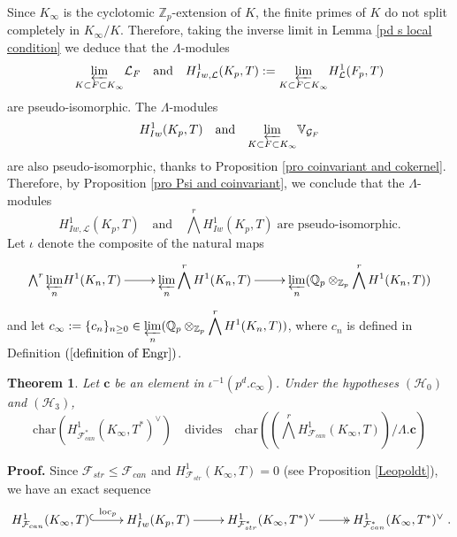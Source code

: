 \documentclass[reqno]{amsart}
\newcounter{dummy} \numberwithin{dummy}{section}
\newtheorem{theo}[dummy]{Theorem }
\begin{document}
Since $K_{\infty}$ is the cyclotomic $\mathbb{Z}_{p}$-extension of
$K$, the  finite primes of $K$ do not split completely in
$K_{\infty}/K$. Therefore, taking the inverse limit in Lemma \ref{pd
s local condition} we deduce that  the $\Lambda$-modules
\begin{equation*}
\displaystyle{\varprojlim_{K\subset F\subset
    K_{\infty}}}\mathcal{L}_{F}\quad\mbox{and}\quad H^{1}_{Iw,\mathcal{L}}(K_{p},T):=\displaystyle{\varprojlim_{K\subset F\subset
    K_{\infty}}}H^{1}_{\mathcal{L}}(F_{p},T)
\end{equation*}
 are pseudo-isomorphic.
  The $\Lambda$-modules
\begin{equation*}
H^{1}_{Iw}(K_{p},T)\quad\mbox{and}\quad
\displaystyle{\varprojlim_{K\subset F\subset
K_{\infty}}}\mathbb{V}_{\mathcal{G}_{F}}
\end{equation*} are also pseudo-isomorphic, thanks to Proposition \ref{pro  coinvariant
and cokernel}. Therefore, by Proposition \ref{pro Psi and
coinvariant}, we conclude that the $\Lambda$-modules
\begin{equation}\label{remark pseudo isomorphic}
H^{1}_{Iw,\mathcal{L}}(K_{p},T)\quad \mbox{and}\quad
\bigwedge^{r}H^{1}_{Iw}(K_{p},T)\;\mbox{are pseudo-isomorphic.}
\end{equation}
 Let $\iota$ denote the composite
of the natural maps
$$
\xymatrix@=2pc{\bigwedge^{r}\displaystyle{\varprojlim_{n}}H^{1}(K_{n},T)\ar[r]&
\displaystyle{\varprojlim_{n}}\bigwedge^{r}H^{1}(K_{n},T)\ar[r]&
\displaystyle{\varprojlim_{n}}(\mathbb{Q}_{p}\otimes_{\mathbb{Z}_{p}}\bigwedge^{r}H^{1}(K_{n},T))}
$$
and let $c_{\infty}:=\{c_{n}\}_{n\geq
0}\in\displaystyle{\varprojlim_{n}}(\mathbb{Q}_{p}\otimes_{\mathbb{Z}_{p}}\bigwedge^{r}H^{1}(K_{n},T))$,
where $c_{n}$ is
 defined in Definition $(\ref{definition of Engr})$.
\begin{theo}\label{theorem fcan divides d Euler system}
 Let $\mathbf{c}$ be an element in
$\iota^{-1}(p^{d}.c_{\infty})$. Under the hypotheses
$(\mathcal{H}_{0})$ and $(\mathcal{H}_{3})$,
$$
\mathrm{char}(H^{1}_{\mathcal{F}_{can}^{\ast}}(K_{\infty},T^{\ast})^{\vee})\quad\mbox{divides}\quad
\mathrm{char}((\bigwedge^{r}H^{1}_{\mathcal{F}_{can}}(K_{\infty},T))/\Lambda.\mathbf{c})
$$
\end{theo}
\noindent \textbf{Proof.} Since $\mathcal{F}_{str}\leq
\mathcal{F}_{can}$ and $H^{1}_{\mathcal{F}_{str}}(K_{\infty},T)=0$
(see Proposition \ref{Leopoldt}), we  have an exact sequence
$$
\xymatrix@=2pc{
H^{1}_{\mathcal{F}_{can}}(K_{\infty},T)\ar@{^{(}->}[r]^-{\mathrm{loc}_{p}}&
H^{1}_{Iw}(K_{p},T)\ar[r]&
H^{1}_{\mathcal{F}_{str}^{\ast}}(K_{\infty},T^{\ast})^{\vee}\ar@{->>}[r]&
H^{1}_{\mathcal{F}_{can}^{\ast}}(K_{\infty},T^{\ast})^{\vee}}.
$$
\end{document}
